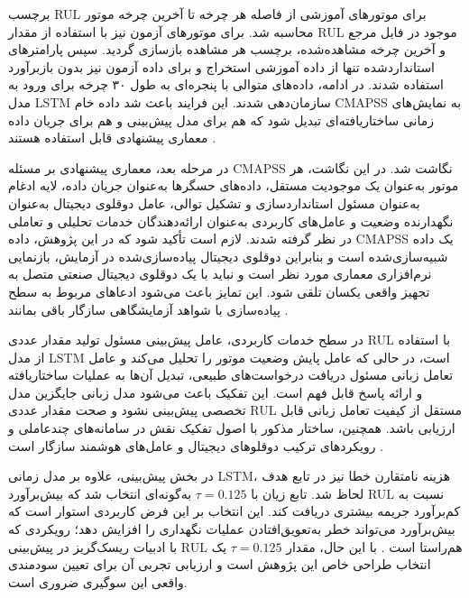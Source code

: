 برچسب \gls{RUL} برای موتورهای آموزشی از فاصله هر چرخه تا آخرین
چرخه موتور محاسبه شد. برای موتورهای آزمون نیز با استفاده از مقدار
\gls{RUL} موجود در فایل مرجع و آخرین چرخه مشاهده‌شده، برچسب هر
مشاهده بازسازی گردید. سپس پارامترهای استاندارد‌شده تنها از داده
آموزشی استخراج و برای داده آزمون نیز بدون بازبرآورد استفاده
شدند. در ادامه، داده‌های متوالی با پنجره‌ای به طول ۳۰ چرخه برای
ورود به مدل \gls{LSTM} سازمان‌دهی شدند. این فرایند باعث شد داده
خام \gls{CMAPSS} به نمایش‌های زمانی ساختاریافته‌ای تبدیل شود که هم
برای مدل پیش‌بینی و هم برای جریان داده معماری پیشنهادی قابل
استفاده هستند \cite{heimes2008recurrent}.

در مرحله بعد، معماری پیشنهادی بر مسئله \gls{CMAPSS} نگاشت شد. در
این نگاشت، هر موتور به‌عنوان یک موجودیت مستقل، داده‌های حسگرها
به‌عنوان جریان داده، لایه ادغام به‌عنوان مسئول استانداردسازی و
تشکیل توالی، عامل دوقلوی دیجیتال به‌عنوان نگهدارنده وضعیت و
عامل‌های کاربردی به‌عنوان ارائه‌دهندگان خدمات تحلیلی و تعاملی
در نظر گرفته شدند. لازم است تأکید شود که در این پژوهش، داده
\gls{CMAPSS} یک داده شبیه‌سازی‌شده است و بنابراین دوقلوی دیجیتال
پیاده‌سازی‌شده در آزمایش، بازنمایی نرم‌افزاری معماری مورد نظر
است و نباید با یک دوقلوی دیجیتال صنعتی متصل به تجهیز واقعی
یکسان تلقی شود. این تمایز باعث می‌شود ادعاهای مربوط به سطح
پیاده‌سازی با شواهد آزمایشگاهی سازگار باقی بمانند
\cite{qi2021enabling,tao2018digital}.

در سطح خدمات کاربردی، عامل پیش‌بینی مسئول تولید مقدار عددی
\gls{RUL} با استفاده از مدل \gls{LSTM} است، در حالی که عامل
پایش وضعیت موتور را تحلیل می‌کند و عامل تعامل زبانی مسئول
دریافت درخواست‌های طبیعی، تبدیل آن‌ها به عملیات ساختاریافته و
ارائه پاسخ قابل فهم است. این تفکیک باعث می‌شود مدل زبانی جایگزین
مدل تخصصی پیش‌بینی نشود و صحت مقدار عددی \gls{RUL} مستقل از
کیفیت تعامل زبانی قابل ارزیابی باشد. همچنین، ساختار مذکور با
اصول تفکیک نقش در سامانه‌های چندعاملی و رویکردهای ترکیب
دوقلوهای دیجیتال و عامل‌های هوشمند سازگار است
\cite{lopez2024madtwin,pretel2022masdt}.

در بخش پیش‌بینی، علاوه بر مدل زمانی \gls{LSTM}، هزینه نامتقارن
خطا نیز در تابع هدف لحاظ شد. تابع زیان  با
$\tau=0.125$ به‌گونه‌ای انتخاب شد که بیش‌برآورد \gls{RUL} نسبت
به کم‌برآورد جریمه بیشتری دریافت کند. این انتخاب بر این فرض
کاربردی استوار است که بیش‌برآورد می‌تواند خطر به‌تعویق‌افتادن
عملیات نگهداری را افزایش دهد؛ رویکردی که با ادبیات
ریسک‌گریز در پیش‌بینی \gls{RUL} هم‌راستا است
\cite{Robinson2026riskaware}. با این حال، مقدار $\tau=0.125$
یک انتخاب طراحی خاص این پژوهش است و ارزیابی تجربی آن برای
تعیین سودمندی واقعی این سوگیری ضروری است.


